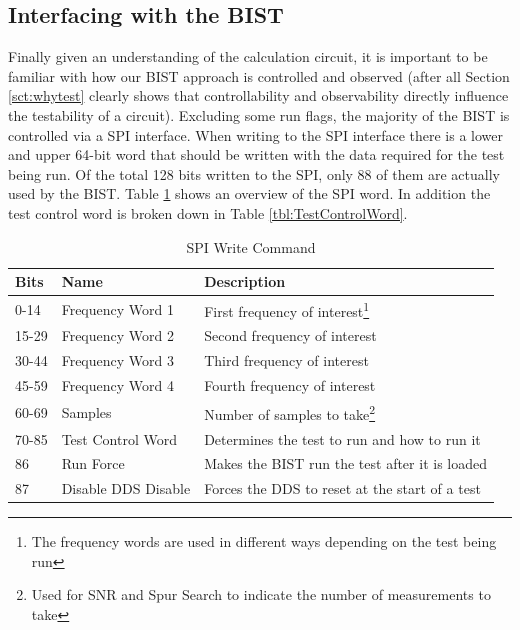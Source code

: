 \documentclass[12pt]{report}
\begin{document}
\subsection{Interfacing with the BIST}
Finally given an understanding of the calculation circuit, it is important to be familiar with how our BIST approach is controlled and observed (after all Section \ref{sct:whytest} clearly shows that controllability and observability directly influence the testability of a circuit).  Excluding some run flags, the majority of the BIST is controlled via a SPI interface.  When writing to the SPI interface there is a lower and upper 64-bit word that should be written with the data required for the test being run.  Of the total 128 bits written to the SPI, only 88 of them are actually used by the BIST.  Table \ref{tbl:SPIWrite} shows an overview of the SPI word.  In addition the test control word is broken down in Table \ref{tbl:TestControlWord}.
\begin{table}
	\begin{minipage}[c]{\textwidth}
		\begin{tabular}{|l|l|l|}
			\hline
			Bits & Name & Description \\ \hline
			0-14 & Frequency Word 1 & First frequency of interest\footnote{The frequency words are used in different ways depending on the test being run} \\ \hline
			15-29 & Frequency Word 2 & Second frequency of interest \\ \hline
			30-44 & Frequency Word 3 & Third frequency of interest \\ \hline
			45-59 & Frequency Word 4 & Fourth frequency of interest \\ \hline
			60-69 & Samples & Number of samples to take\footnote{Used for SNR and Spur Search to indicate the number of measurements to take} \\ \hline
			70-85 & Test Control Word & Determines the test to run and how to run it \\ \hline
			86 & Run Force & Makes the BIST run the test after it is loaded \\ \hline
			87 & Disable DDS Disable & Forces the DDS to reset at the start of a test \\ \hline	
		\end{tabular}	
	\end{minipage}
	\caption{SPI Write Command}
	\label{tbl:SPIWrite}
\end{table}
\end{document}
